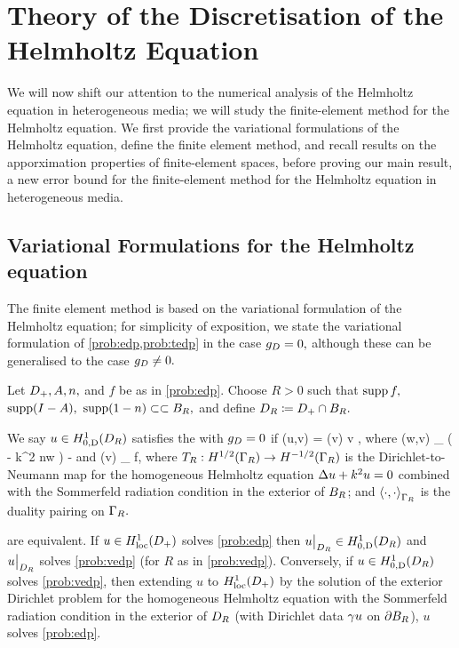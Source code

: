 \section{Theory of the Discretisation of the Helmholtz Equation}\label{sec:helmfe}

We will now shift our attention to the numerical analysis of the Helmholtz equation in heterogeneous media; we will study the finite-element method for the Helmholtz equation. We first provide the variational formulations of the Helmholtz equation, define the finite element method, and recall results on the apporximation properties of finite-element spaces, before proving our main result, a new error bound for the finite-element method for the Helmholtz equation in heterogeneous media.

  \subsection{Variational Formulations for the Helmholtz equation}\label{sec:varform}
  The finite element method is based on the variational formulation of the Helmholtz equation; for simplicity of exposition, we state the variational formulation of \cref{prob:edp,prob:tedp} in the case $g_{D} = 0,$ although these can be generalised to the case $g_{D} \neq 0.$
  
\bprob[Variational formulation of EDP when $\gD = 0$]\label{prob:vedp}
Let $D_{+}, A, n,$ and $f$ be as in \cref{prob:edp}. Choose $R>0$ such that $\operatorname{supp} f,$ $\operatorname{supp}(I-A),$ $\operatorname{supp}(1-n) \subset\subset B_{R},$ and define $D_{R} \coloneqq D_{+} \cap B_{R}.$

We say $u \in \HozDDR$ satisfies the  with $\gD = 0$ if
\beqs
\aE(u,v) = \FE(v) \tfa v \in \HozDDR,
\eeqs
where
\beqs
\aE(w,v) \de \int_{\DR} \mleft( - k^2 n\minispace w \vbar\mright) - 
\eeqs
and
\beqs
\FE(v) \de \int_{\DR} f\minispace\vbar,
\eeqs
where $\TR:\HhGR\rightarrow \HmhGR$ is the Dirichlet-to-Neumann map for the homogeneous Helmholtz equation $\Delta u + k^2 u = 0$ combined with the Sommerfeld radiation condition in the exterior of $B_{R}$; and $\DPGR{\cdot}{\cdot}$ is the duality pairing on $\Gamma_{R}.$
\eprob

\label{lem:edpform}
 are equivalent. If $u \in \HolocDp$ solves \cref{prob:edp} then $u\restrict_{\DR} \in \HozDDR$ and $u\big|_{D_{R}}$ solves \cref{prob:vedp}  (for $R$ as in \cref{prob:vedp}). Conversely, if $u \in \HozDDR$ solves \cref{prob:vedp}, then extending $u$ to $\HolocDp$ by the solution of the exterior Dirichlet problem for the homogeneous Helmholtz equation with the Sommerfeld radiation condition in the exterior of $D_{R}$ (with Dirichlet data $\gamma u$ on $\partial B_{R}$), $u$ solves \cref{prob:edp}.
\ele

